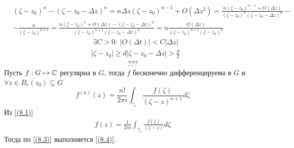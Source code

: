 \begin{align*}
  & (\zeta-z_0)^n - (\zeta - z_0 - \Delta z)^n = n\Delta z(\zeta - z_0)^{n-1} + O(\Delta z^2) = \frac{n(\zeta-z_0)^{n-1}+O(\Delta z)}{(\zeta - z_0)^n(\zeta-z_0-\Delta z)^n} - \\
  & - \frac{n}{(\zeta - z_0)^{n+1}} = \frac{n(\zeta-z_0)^n+O(\Delta z) - (\zeta-z_0-\Delta z)^n}{(\zeta - z_0)^{n+1}(\zeta - z_0 - \Delta z)^n} = n \frac{O(\Delta z)}{(\zeta - z_0)^{n+1}(\zeta - z_0)^n}
\end{align*}
\begin{align*}
  & \exists C > 0: \ \left| O(\Delta t) \right| < C \left| \Delta z \right|
\end{align*}
\begin{align*}
  & \left| \zeta - z_0 \right| \geq d \left| \zeta - z_0 - \Delta z \right| > \frac{d}{2}
\end{align*}
\begin{align*}
  ???
\end{align*}
\theorem
Пусть $f: G \mapsto \mathbb{C}$ регулярна в $G$, тогда $f$ бесконечно дифференцируема в
$G$ и $\forall z \in \overline{B_r(z_0)} \subseteq G$
\begin{equation} \label{(8.4)}
    f^{(n)}(z) = \frac{n!}{2 \pi i}\int_{\gamma_r}\frac{f(\zeta)}{(\zeta - z)^{n+1}}d\zeta
\end{equation}
\pr
Из \eqref{(8.1)}
\begin{align*}
  f(z) = \frac{1}{2 \pi i}\int_{\gamma_r}\frac{f(\zeta)}{(\zeta - z)}d\zeta
\end{align*}
Тогда по \eqref{(8.3)} выполняется \eqref{(8.4)}.
